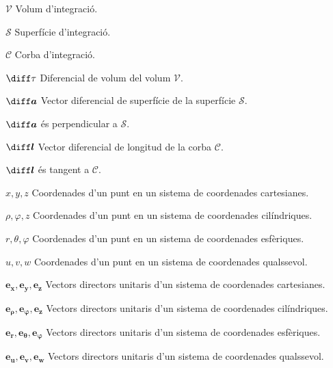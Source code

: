 \documentclass[catalan,a4paper,twoside,11pt]{article}
\begin{document}
\begin{list}{}
{\setlength{\labelwidth}{20mm}
\setlength{\leftmargin}{25mm}\setlength{\labelsep}{5mm}}
   \item[$\mathscr{V}$] Volum d'integració.

   \item[$\mathscr{S}$] Superfície d'integració.

   \item[$\mathscr{C}$] Corba d'integració.

   \item[$\diff\tau$] Diferencial de volum del volum $\mathscr{V}$.

   \item[$\boldsymbol{\diff a}$] Vector diferencial de superfície de la superfície $\mathscr{S}$.

   $\boldsymbol{\diff a}$ és perpendicular a $\mathscr{S}$.

   \item[$\boldsymbol{\diff l}$] Vector diferencial de longitud de la corba
   $\mathscr{C}$.

   $\boldsymbol{\diff l}$ és tangent a $\mathscr{C}$.

   \item[$x,y,z$] Coordenades d'un punt en un sistema de coordenades cartesianes.

   \item[$\rho,\varphi,z$] Coordenades d'un punt en un sistema de   coordenades cilíndriques.

   \item[$r,\theta,\varphi$] Coordenades d'un punt en un sistema de   coordenades esfèriques.

   \item[$u,v,w$] Coordenades d'un punt en un sistema de   coordenades qualssevol.
   \item[$\boldsymbol{e_x},\boldsymbol{e_y},\boldsymbol{e_z}$]
   Vectors directors unitaris d'un sistema de  coordenades    cartesianes.

   \item[$\boldsymbol{e_\rho},\boldsymbol{e_\varphi},\boldsymbol{e_z}$] Vectors directors unitaris d'un sistema de   coordenades cilíndriques.

   \item[$\boldsymbol{e_r},\boldsymbol{e_\theta},\boldsymbol{e_\varphi}$] Vectors directors unitaris d'un sistema de   coordenades esfèriques.

   \item[$\boldsymbol{e_u},\boldsymbol{e_v},\boldsymbol{e_w}$]
   Vectors directors unitaris d'un sistema de  coordenades   qualssevol.


\end{list}
\end{document}
